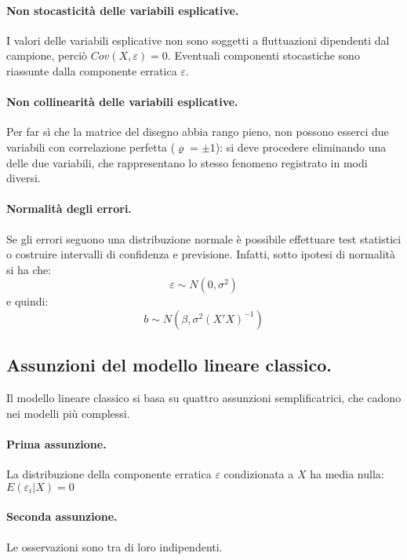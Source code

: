 \documentclass[11pt]{article}
\begin{document}
\paragraph{Non stocasticità delle variabili esplicative.}
I valori delle variabili esplicative non sono soggetti a fluttuazioni dipendenti dal campione, perciò $Cov(X,\varepsilon) = 0$.
Eventuali componenti stocastiche sono riassunte dalla componente erratica $\varepsilon$.

\paragraph{Non collinearità delle variabili esplicative.}
Per far sì che la matrice del disegno abbia rango pieno, non possono esserci due variabili con correlazione perfetta ($\varrho = \pm1$): si deve procedere eliminando una delle due variabili, che rappresentano lo stesso fenomeno registrato in modi diversi.

\paragraph{Normalità degli errori.}
Se gli errori seguono una distribuzione normale è possibile effettuare test statistici o costruire intervalli di confidenza e previsione.
Infatti, sotto ipotesi di normalità si ha che:
\begin{equation*}
  \varepsilon \sim N(0, \sigma^2)
\end{equation*}
e quindi:
\begin{equation*}
  b \sim N(\beta, \sigma^2(X'X)^{-1})
\end{equation*}

\subsection{Assunzioni del modello lineare classico.}
Il modello lineare classico si basa su quattro assunzioni semplificatrici, che cadono nei modelli più complessi.

\paragraph{Prima assunzione.}
La distribuzione della componente erratica $\varepsilon$ condizionata a $X$ ha media nulla: $E(\varepsilon_i | X) = 0$

\paragraph{Seconda assunzione.}
Le osservazioni sono tra di loro indipendenti.
\end{document}

